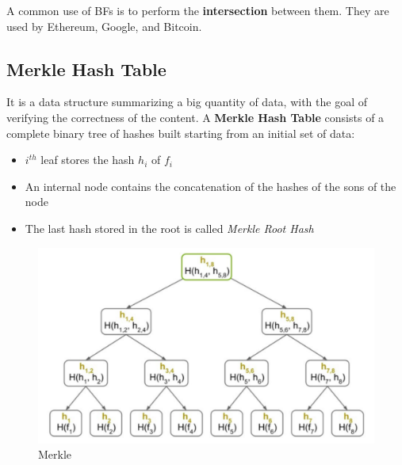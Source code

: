 A common use of BFs is to perform the \textbf{intersection} between them.
They are used by Ethereum, Google, and Bitcoin.

\subsection{Merkle Hash Table}
\begin{paracol}{2}
   It is a data structure summarizing a big quantity of data, with the goal of verifying the correctness of the content.
   A \textbf{Merkle Hash Table} consists of a complete binary tree of hashes built starting from an initial set of data:
   \begin{itemize}
      \item $i^{th}$ leaf stores the hash $h_i$ of $f_i$ 
      \item An internal node contains the concatenation of the hashes of the sons of the node
      \item The last hash stored in the root is called \textit{Merkle Root Hash}
   \end{itemize}
   
\switchcolumn

\begin{figure}[htbp]
   \centering
   \includegraphics{images/merkle.png}
   \caption{Merkle}
   \label{fig:merkle}
\end{figure}
\end{paracol}

